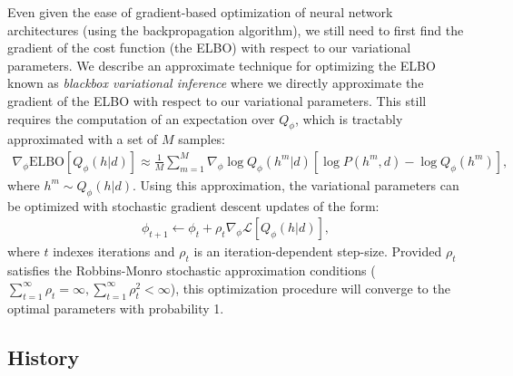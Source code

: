 Even given the ease of gradient-based optimization of neural network architectures (using the backpropagation algorithm), we still need to first find the gradient of the cost function (the ELBO) with respect to our variational parameters. We describe an approximate technique for optimizing the ELBO known as \emph{blackbox variational inference} \citep{ranganath2014black} where we directly approximate the gradient of the ELBO with respect to our variational parameters. This still requires the computation of an expectation over $Q_\phi$, which is tractably approximated with a set of $M$ samples:
\begin{align}
    \nabla_\phi \text{ELBO}[Q_\phi(h|d)] \approx \frac{1}{M} \sum_{m=1}^M \nabla_\phi \log Q_\phi(h^m|d) \left[ \log P(h^m,d) - \log Q_\phi(h^m) \right],
\end{align}
where $h^m \sim Q_\phi(h|d)$. Using this approximation, the variational parameters can be optimized with stochastic gradient descent updates of the form:
\begin{align}
    \phi_{t+1} \leftarrow \phi_t + \rho_t \nabla_\phi \mathcal{L}[Q_\phi(h|d)],
\end{align}
where $t$ indexes iterations and $\rho_t$ is an iteration-dependent step-size. Provided $\rho_t$ satisfies the Robbins-Monro stochastic approximation conditions ($\sum_{t=1}^\infty \rho_t = \infty, \sum_{t=1}^\infty \rho_t^2 < \infty$), this optimization procedure will converge to the optimal parameters with probability 1.

\subsection{History}

